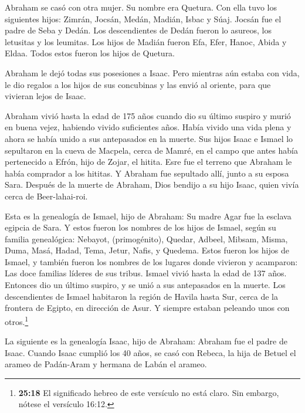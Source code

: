 Abraham se casó con otra mujer. Su nombre era Quetura.
 Con ella tuvo los siguientes hijos: Zimrán, Jocsán, Medán,
Madián, Isbac y Súaj.  Jocsán fue el padre de Seba y Dedán.
Los descendientes de Dedán fueron lo asureos, los letusitas y los
leumitas.  Los hijos de Madián fueron Efa, Efer, Hanoc,
Abida y Eldaa. Todos estos fueron los hijos de Quetura.

 Abraham le dejó todas sus posesiones a Isaac. 
Pero mientras aún estaba con vida, le dio regalos a los hijos de sus
concubinas y las envió al oriente, para que vivieran lejos de Isaac.

 Abraham vivió hasta la edad de 175 años  cuando
dio su último suspiro y murió en buena vejez, habiendo vivido
suficientes años. Había vivido una vida plena y ahora se había unido a
sus antepasados en la muerte.  Sus hijos Isaac e Ismael lo
sepultaron en la cueva de Macpela, cerca de Mamré, en el campo que antes
había pertenecido a Efrón, hijo de Zojar, el hitita.  Esre
fue el terreno que Abraham le había comprador a los hititas. Y Abraham
fue sepultado allí, junto a su esposa Sara.  Después de la
muerte de Abraham, Dios bendijo a su hijo Isaac, quien vivía cerca de
Beer-lahai-roi.

 Esta es la genealogía de Ismael, hijo de Abraham: Su madre
Agar fue la esclava egipcia de Sara.  Y estos fueron los
nombres de los hijos de Ismael, según su familia genealógica: Nebayot,
(primogénito), Quedar, Adbeel, Mibsam,  Misma, Duma, Masá,
 Hadad, Tema, Jetur, Nafis, y Quedema.  Estos
fueron los hijos de Ismael, y también fueron los nombres de los lugares
donde vivieron y acamparon: Las doce familias líderes de sus tribus.
 Ismael vivió hasta la edad de 137 años. Entonces dio un
último suspiro, y se unió a sus antepasados en la muerte. 
Los descendientes de Ismael habitaron la región de Havila hasta Sur,
cerca de la frontera de Egipto, en dirección de Asur. Y siempre estaban
peleando unos con otros.\footnote{\textbf{25:18} El significado hebreo
  de este versículo no está claro. Sin embargo, nótese el versículo
  16:12.}

 La siguiente es la genealogía Isaac, hijo de Abraham:
Abraham fue el padre de Isaac.  Cuando Isaac cumplió los 40
años, se casó con Rebeca, la hija de Betuel el arameo de Padán-Aram y
hermana de Labán el arameo.

